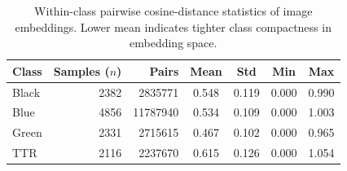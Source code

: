 \documentclass{article}
\begin{document}
\begin{appendices}
\begin{table}[!htb]
\centering
\begin{tabular}{|l|r|r|c|c|c|c|}
\hline
Class & Samples ($n$) & Pairs & Mean & Std & Min & Max \\
\hline
Black & 2382 & 2835771  & 0.548 & 0.119 & 0.000 & 0.990 \\
\hline
Blue  & 4856 & 11787940 & 0.534 & 0.109 & 0.000 & 1.003 \\
\hline
Green & 2331 & 2715615  & 0.467 & 0.102 & 0.000 & 0.965 \\
\hline
TTR   & 2116 & 2237670  & 0.615 & 0.126 & 0.000 & 1.054 \\
\hline
\end{tabular}
\caption{Within-class pairwise cosine-distance statistics of image embeddings. Lower mean indicates tighter class compactness in embedding space.}
\label{tab:embedding_distance_stats}
\end{table}

\end{appendices}
\end{document}
